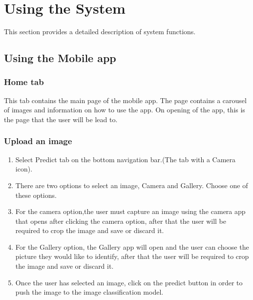 \documentclass[a4paper, 12pt]{article}
\begin{document}
\section{Using the System}
This section provides a detailed description of system functions. 
\subsection{Using the Mobile app}

\subsubsection{Home tab}
This tab contains the main page of  the mobile app. The page contains a carousel of images and information on how to use the app. On opening of the app, this is the page that the user will be lead to.

\subsubsection{Upload an image}

\begin{enumerate}
\item Select Predict tab on the bottom navigation bar.(The tab with a Camera icon).
\item There are two options to select an image, Camera and Gallery. Choose one of these options.
\item For the camera option,the user must capture an image using the camera app that opens after clicking the camera option, after that the  user will be required to crop the image and save or discard it.
\item For the Gallery option, the Gallery app will open and the user can choose the picture they would like to identify, after that the  user will be required to crop the image and save or discard it.

\item Once the user has selected an image, click on the predict button in order to push the image to the image classification model.

\end{enumerate}
\end{document}

